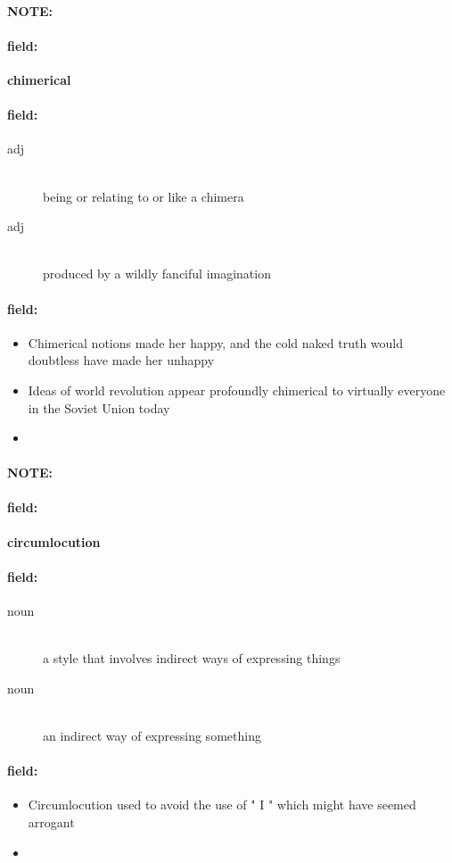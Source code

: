\documentclass[12pt]{article}
\newenvironment{note}{\paragraph{NOTE:}}{}
\newenvironment{field}{\paragraph{field:}}{}
\begin{document}
\begin{note}
\begin{field}
\textbf{\large chimerical}
\end{field}


\begin{field}
\begin{description}
\item[adj] \hfill \\ 
being or relating to or like a chimera

\item[adj] \hfill \\ 
produced by a wildly fanciful imagination

\end{description}
\end{field}

\begin{field}
\begin{itemize}
\item Chimerical notions made her happy, and the cold naked truth would doubtless have made her unhappy
\item Ideas of world revolution appear profoundly chimerical to virtually everyone in the Soviet Union today
\item 
\end{itemize}
\end{field}
\end{note}
\begin{note}
\begin{field}
\textbf{\large circumlocution}
\end{field}


\begin{field}
\begin{description}
\item[noun] \hfill \\ 
a style that involves indirect ways of expressing things

\item[noun] \hfill \\ 
an indirect way of expressing something

\end{description}
\end{field}

\begin{field}
\begin{itemize}
\item Circumlocution used to avoid the use of " I " which might have seemed arrogant
\item 
\end{itemize}
\end{field}
\end{note}
\end{document}
